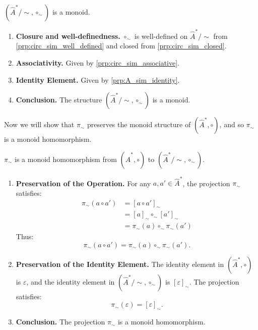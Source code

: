 \begin{propositionE}
\label{prp:A_sim_is_monoid}
    $(\hat{A}^{*}/\sim, \circ_{\sim})$ is a monoid.
\end{propositionE}
\begin{proofE}
\begin{enumerate}
    \item \textbf{Closure and well-definedness.}
    $\circ_{\sim}$ is well-defined on $\hat{A}^{*}/\sim$ from \cref{prp:circ_sim_well_defined} and closed from \cref{prp:circ_sim_closed}.

    \item \textbf{Associativity.}
    Given by \cref{prp:circ_sim_associative}.

    \item \textbf{Identity Element.}
    Given by \cref{prp:A_sim_identity}.

    \item \textbf{Conclusion.}
    The structure $(\hat{A}^{*}/\sim, \circ_{\sim})$ is a monoid.
\end{enumerate}
\end{proofE}


Now we will show that $\pi_{\sim}$ preserves the monoid structure of $(\hat{A}^{*}, \circ)$, and so $\pi_{\sim}$ is a monoid homomorphism.

\begin{propositionE}
    $\pi_{\sim}$ is a monoid homomorphism from $(\hat{A}^{*}, \circ)$ to $(\hat{A}^{*}/\sim, \circ_{\sim})$.
\end{propositionE}
\begin{proofE}
\begin{enumerate}
    \item \textbf{Preservation of the Operation.}
    For any $a, a' \in \hat{A}^{*}$, the projection $\pi_{\sim}$ satisfies:
    \begin{align}
      \pi_{\sim}(a \circ a') & = [a \circ a']_{\sim}                 \\
                          & = [a]_{\sim} \circ_{\sim} [a']_{\sim} \\
                          & = \pi_{\sim}(a) \circ_{\sim} \pi_{\sim}(a')
    \end{align}
    Thus:
    \begin{equation}
      \pi_{\sim}(a \circ a') = \pi_{\sim}(a) \circ_{\sim} \pi_{\sim}(a').
    \end{equation}

    \item \textbf{Preservation of the Identity Element.}
    The identity element in $(\hat{A}^{*}, \circ)$ is $\varepsilon$, and the identity element in $(\hat{A}^{*}/\sim, \circ_{\sim})$ is $[\varepsilon]_{\sim}$.
    The projection satisfies:
    \begin{equation}
      \pi_{\sim}(\varepsilon) = [\varepsilon]_{\sim}.
    \end{equation}

    \item \textbf{Conclusion.}
    The projection $\pi_{\sim}$ is a monoid homomorphism.
\end{enumerate}
\end{proofE}


